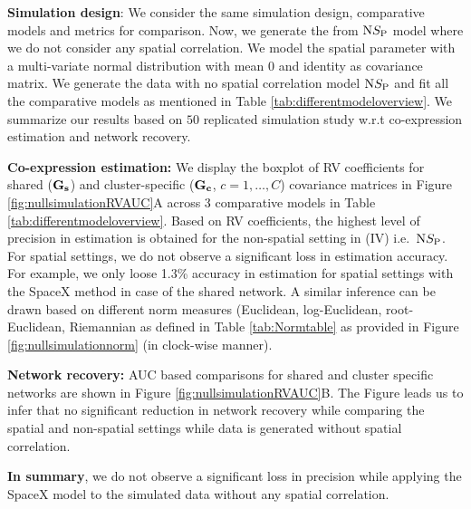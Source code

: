 \documentclass[
]{book}
\begin{document}
\textbf{Simulation design}:
We consider the same simulation design, comparative models and metrics for comparison. Now, we generate the from \(\text NS_{\text P}\) model where we do not consider any spatial correlation. We model the spatial parameter with a multi-variate normal distribution with mean \(0\) and identity as covariance matrix. We generate the data with no spatial correlation model \(\text NS_{\text P}\) and fit all the comparative models as mentioned in Table \ref{tab:differentmodeloverview}. We summarize our results based on \(50\) replicated simulation study w.r.t co-expression estimation and network recovery.

\textbf{Co-expression estimation:}
We display the boxplot of RV coefficients for shared (\(\bf G_{s}\)) and cluster-specific (\(\bf G_{c}\), \(c=1, \dots, C\)) covariance matrices in Figure \ref{fig:nullsimulationRVAUC}A across 3 comparative models in Table \ref{tab:differentmodeloverview}. Based on RV coefficients, the highest level of precision in estimation is obtained for the non-spatial setting in (IV) i.e.~\(\text NS_{\text P}\). For spatial settings, we do not observe a significant loss in estimation accuracy. For example, we only loose 1.3\% accuracy in estimation for spatial settings with the SpaceX method in case of the shared network. A similar inference can be drawn based on different norm measures (Euclidean, log-Euclidean, root-Euclidean, Riemannian as defined in Table \ref{tab:Normtable} as provided in Figure \ref{fig:nullsimulationnorm} (in clock-wise manner).

\textbf{Network recovery:} AUC based comparisons for shared and cluster specific networks are shown in Figure \ref{fig:nullsimulationRVAUC}B. The Figure leads us to infer that no significant reduction in network recovery while comparing the spatial and non-spatial settings while data is generated without spatial correlation.

\textbf{In summary}, we do not observe a significant loss in precision while applying the SpaceX model to the simulated data without any spatial correlation.
\end{document}
